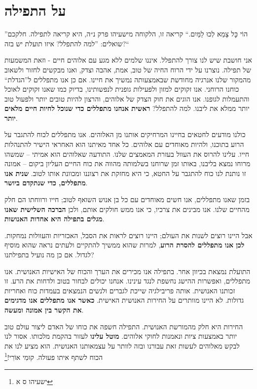 \documentclass[14pt, article, extrafontsizes, twopage, a4paper]{memoir}
\begin{document}
\chapter{על התפילה}
{\larger

”הוֹי כׇּל צָמֵא לְכוּ לַמַּיִם.“
קריאה זו, הלקוחה מישעיהו פרק נ״ה, היא קריאה לתפילה. חלקכם שואלים: ”למה להתפלל? איזו תועלת יש בזה?“

אני חושבת שיש לנו צורך להתפלל. איננו שלמים ללא מגע עם אלוהים חיים - וזאת המשמעות של תפילה. נוצרנו על ידי הרוח החיה של טוב, אמת, אהבה וצדק, ואנו מבקשים לחזור ולשאוב מהמקור שלנו אנרגיה מחודשת שבאמצעותה נמשיך את חיינו. אם כן אנו מתפללים ל”הגדלת“ כוחנו הרוחני. אנו זקוקים למזון ולפעילות גופנית לנפשותינו, בדיוק כמו שאנו זקוקים לאוכל והתעמלות לגופנו. אנו הוגים את חוק הצדק של אלוהים, והרצון להיות טובים יותר ולפעול טוב יותר ממלא את ליבנו. למה להתפלל? \textbf{ראשית אנחנו מתפללים כדי שנוכל לחיות חיים מלאים יותר}.

כולנו מודעים לחטאים בחיינו המרחיקים אותנו מן האלוהים. אנו מתפללים לכוח להתגבר על הרוע בתוכנו, ולהיות מאוחדים עם אלוהים. כל אחד מאיתנו הוא האחראי הישיר להתנהלות חייו. עלינו להרוס את העוול בעזרת המאמצים שלנו. התודעה שאלוהים הוא אמיתי -- שמשהו מרוחו נמצא בליבנו, באותו זמן שרוחנו בשלמותה מהווה את כוח החיים העליון ביקום – אמונה זו נותנת לנו כוח להתגבר על החטא, כי היא מחזקת את רצוננו ומכוונת אותו לטוב. \textbf{שנית אנו מתפללים, כדי שנתקדם ביושר}.

בזמן שאנו מתפללים, אנו חשים מאוחדים עם כל בן אנוש השואף לטוב; חייו ורווחתו הם חלק מהחיים שלנו. אנו מבינים את צרכיו, כי אנו ממש חולקים אותם, ולכן \textbf{הברכה השלישית שאנו מגלים בתפילה היא אחדות האנושות}.

אבל היינו רוצים לשנות את העולם; היינו רוצים לראות את הסבל, האכזריות והעוולות נמחקות. \textbf{לכן אנו מתפללים להסרת הרוע}, למרות שהוא ממשיך להתקיים ולעתים נראה שהוא מוסיף לגדול. אם כן מה נועיל בתפילתנו?

התועלת נמצאת בכיוון אחר. בתפילה אנו מכירים את הערך והכוח של האישיות האנושית. אנו מתפללים, ואפשרות ההישג נחשפת לנגד עינינו. אנחנו יכולים לבחור בטוב ולדחות את הרע. זו זכותנו האנושית. אותה פריבילגיה שייכת לגברים ולנשים הנמצאים בעמדות כוח ואחריות גדולות. לא היינו מוותרים על החירות האנושית האישית. \textbf{כאשר אנו מתפללים אנו מדגימים את הקשר בין אמונה ומעשה}.

החירות היא חלק מהמורשת האנושית. התפילה חשפה את כוחו של האדם ליצור עולם טוב יותר באמצעות ציות ונאמנות לחוקי אלוהים. \textbf{מוטל עלינו} לעזור בהקמת מלכותו. אסור לנו לבקש מאלוהים לעשות זאת עבורנו ובזה לוותר על עצמאותנו האנושית. הוא מציע לנו את הכוח לשתף איתו פעולה. קוּמִי אוֹרִי!\footnote{ישעיהו ס א}

}
\end{document}
